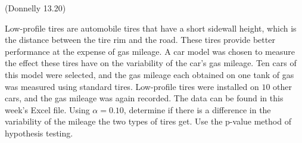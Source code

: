 \documentclass[12pt, letterpaper]{article}
\newcounter{exercise}
\theoremstyle{definition}
\begin{document}
\vfill

\newpage


\begin{exercise}  (Donnelly 13.20)

Low-profile tires are automobile tires that have a short sidewall height, which is the distance between the tire rim and the road.  These tires provide better performance at the expense of gas mileage.  A car model was chosen to measure the effect these tires have on the variability of the car's gas mileage.  Ten cars of this model were selected, and the gas mileage each obtained on one tank of gas was measured using standard tires.  Low-profile tires were installed on $10$ other cars, and the gas mileage was again recorded.  The data can be found in this week's Excel file.  Using $\alpha = 0.10$, determine if there is a difference in the variability of the mileage the two types of tires get.  Use the p-value method of hypothesis testing.

\end{exercise}

\vfill
\end{document}
